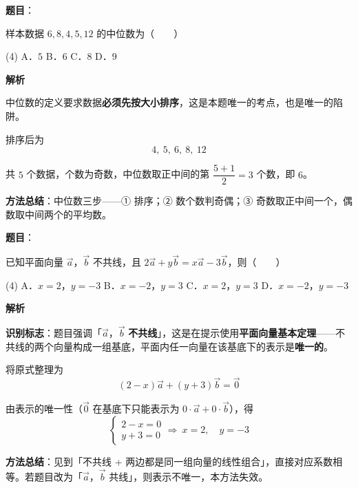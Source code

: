 \begin{answer}

\textbf{题目}：

样本数据 $6,8,4,5,12$ 的中位数为\mbox{（　　）}

\begin{gkopts}(4)
\task A．$5$
\task B．$6$
\task C．$8$
\task D．$9$
\end{gkopts}

\textbf{解析}

中位数的定义要求数据\textbf{必须先按大小排序}，这是本题唯一的考点，也是唯一的陷阱。

排序后为
\nopagebreak[4]
\[4,\ 5,\ 6,\ 8,\ 12\]

共 $5$ 个数据，个数为奇数，中位数取正中间的第 $\dfrac{5+1}{2}=3$ 个数，即 $6$。

\begin{gktip}
\textbf{方法总结}：中位数三步——① 排序；② 数个数判奇偶；③ 奇数取正中间一个，偶数取中间两个的平均数。
\end{gktip}


\par\medskip

\end{answer}
\begin{answer}

\textbf{题目}：

已知平面向量 $\vec{a}$，$\vec{b}$ 不共线，且 $2\vec{a}+y\vec{b}=x\vec{a}-3\vec{b}$，则\mbox{（　　）}

\begin{gkopts}(4)
\task A．$x=2$，$y=-3$
\task B．$x=-2$，$y=3$
\task C．$x=2$，$y=3$
\task D．$x=-2$，$y=-3$
\end{gkopts}

\textbf{解析}

\textbf{识别标志}：题目强调「$\vec a$，$\vec b$ \textbf{不共线}」，这是在提示使用\textbf{平面向量基本定理}——不共线的两个向量构成一组基底，平面内任一向量在该基底下的表示是\textbf{唯一的}。

将原式整理为
\nopagebreak[4]
\[(2-x)\vec a+(y+3)\vec b=\vec 0\]

由表示的唯一性（$\vec 0$ 在基底下只能表示为 $0\cdot\vec a+0\cdot\vec b$），得
\nopagebreak[4]
\[\begin{cases}2-x=0\\ y+3=0\end{cases}\Longrightarrow\ x=2,\quad y=-3\]

\begin{gktip}
\textbf{方法总结}：见到「不共线 + 两边都是同一组向量的线性组合」，直接对应系数相等。若题目改为「$\vec a$，$\vec b$ 共线」，则表示不唯一，本方法失效。
\end{gktip}


\par\medskip

\end{answer}
